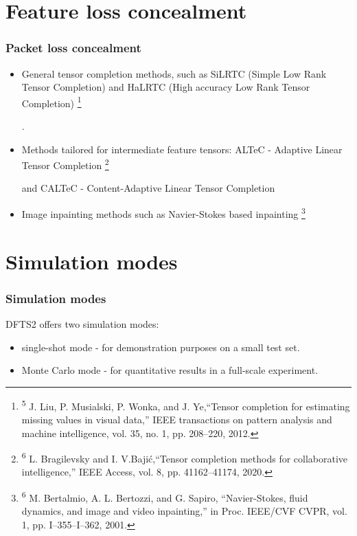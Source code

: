 \documentclass[aspectratio=169]{beamer}
\newcommand\blfootnote[1]{%
	\begingroup
	\renewcommand\thefootnote{}\footnote{#1}%
	\addtocounter{footnote}{-1}%
	\endgroup
}
\begin{document}
\section{Feature loss concealment}
\begin{frame}
	\frametitle{Packet loss concealment}
	\begin{itemize}
		\item General tensor completion methods, such as SiLRTC (Simple Low Rank Tensor Completion) and HaLRTC (High accuracy Low Rank Tensor Completion) \cite{liu2012tensor}\blfootnote{\tiny \textsuperscript{5} J. Liu, P. Musialski, P. Wonka, and J. Ye,``Tensor completion for estimating missing values in visual data,” IEEE transactions on pattern analysis and machine intelligence, vol. 35, no. 1, pp. 208–220, 2012.}.
		\item Methods tailored for intermediate feature tensors: ALTeC - Adaptive Linear Tensor Completion \cite{Bragile2020} \blfootnote{\tiny \textsuperscript{6} L. Bragilevsky and I. V.Bajić,``Tensor completion methods for collaborative intelligence,” IEEE Access, vol. 8, pp. 41162–41174, 2020.} and CALTeC - Content-Adaptive Linear Tensor Completion
		\item Image inpainting methods such as Navier-Stokes based inpainting \cite{navierstokes} \blfootnote{\tiny \textsuperscript{6} M. Bertalmio, A. L. Bertozzi, and G. Sapiro, ``Navier-Stokes, fluid dynamics, and image and video inpainting,” in Proc. IEEE/CVF CVPR, vol. 1, pp. I–355–I–362, 2001.}
	\end{itemize}
\end{frame}

\section{Simulation modes}
\begin{frame}
\frametitle{Simulation modes}
DFTS2 offers two simulation modes:
	\begin{itemize}
		\item single-shot mode - for demonstration purposes on a small test set.
		\item Monte Carlo mode - for quantitative results in a full-scale experiment.
	\end{itemize}
\end{frame}
\end{document}

